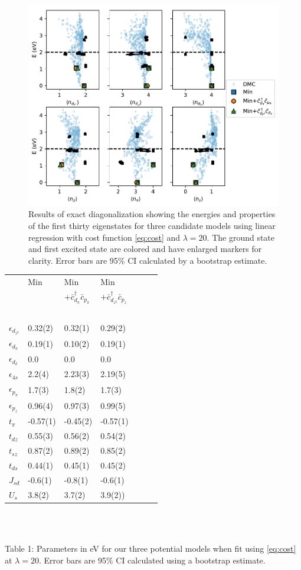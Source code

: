\documentclass{article}
\begin{document}
\begin{figure}[H]
\centering
\includegraphics[width=0.7\linewidth]{../qwalk/old/ub3lyp_s1_/analysis/figs/final_ed.pdf}
\caption{Results of exact diagonalization showing the energies and properties of the first thirty eigenstates for three candidate models using linear regression with cost function \ref{eq:cost} and $\lambda = 20$. The ground state and first excited state are colored and have enlarged markers for clarity. Error bars are 95\% CI calculated by a bootstrap estimate.}
\label{fig:FinalED}
\end{figure}	
\begin{table}[H]
\begin{center}

\begin{tabular}{l|llllll}
&Min & Min & Min \\
& & $ + \bar{c}_{d_\pi}^\dagger \bar{c}_{p_\pi}$ & $ + \bar{c}_{d_{z^2}}^\dagger \bar{c}_{p_z}$ \\ $\ $ \\ \hline 
$\epsilon_{d_{z^2}}$& 0.32(2)& 0.32(1)& 0.29(2)\\
$\epsilon_{d_\pi}$& 0.19(1)& 0.10(2)& 0.19(1)\\
$\epsilon_{d_\delta}$& 0.0 & 0.0 & 0.0\\
$\epsilon_{4s}$& 2.2(4)& 2.23(3)& 2.19(5)\\
$\epsilon_{p_\pi}$& 1.7(3)& 1.8(2)& 1.7(3)\\
$\epsilon_{p_z}$& 0.96(4)& 0.97(3)& 0.99(5)\\
$t_\pi$& -0.57(1)& -0.45(2)& -0.57(1)\\
$t_{dz}$& 0.55(3)& 0.56(2)& 0.54(2)\\
$t_{sz}$& 0.87(2)& 0.89(2)& 0.85(2)\\
$t_{ds}$& 0.44(1)& 0.45(1)& 0.45(2)\\
$J_{sd}$& -0.6(1)& -0.8(1)& -0.6(1)\\
$U_s$& 3.8(2)& 3.7(2)& 3.9(2))\\
\end{tabular}
\\ $\ $
\\
\end{center}
Table 1: Parameters in eV for our three potential models when fit using \eqref{eq:cost} at $\lambda = 20$. Error bars are 95\% CI calculated using a bootstrap estimate.
\end{table}
\end{document}
